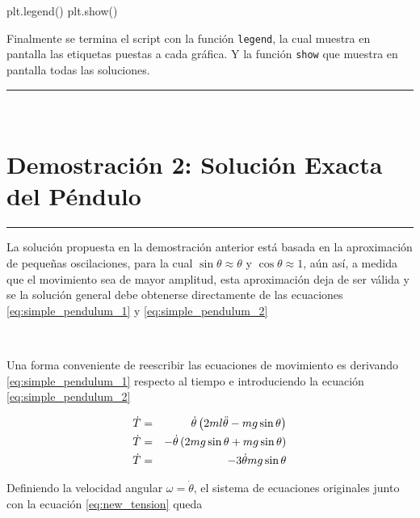 \begin{listing}[style=python, numbers = none]
plt.legend()
plt.show()
\end{listing}
Finalmente se termina el script con la función \texttt{legend}, la cual 
muestra en pantalla las etiquetas puestas a cada gráfica. Y la función 
\texttt{show} que muestra en pantalla todas las soluciones.

\rule{14cm}{0.5mm}



\
\section{Demostración 2: Solución Exacta del Péndulo}
\label{sec:DEMO2_02}
\rule{14cm}{0.5mm}

La solución propuesta en la demostración anterior está basada en la 
aproximación de pequeñas oscilaciones, para la cual $\sin \theta \approx 
\theta$ y $\cos \theta \approx 1$, aún así, a medida que el movimiento sea
de mayor amplitud, esta aproximación deja de ser válida y se la solución 
general debe obtenerse directamente de las ecuaciones 
\ref{eq:simple_pendulum_1} y \ref{eq:simple_pendulum_2}

\

Una forma conveniente de reescribir las ecuaciones de movimiento es derivando
\ref{eq:simple_pendulum_1} respecto al tiempo e introduciendo la ecuación
\ref{eq:simple_pendulum_2}


\begin{eqnarray}
\nonumber
\dot T &=& \dot \theta \left(  2ml\ddot \theta - mg\sin \theta  \right) \\
\nonumber
\dot T &=& -\dot \theta \left(  2mg\sin \theta + mg\sin \theta  \right) \\
\label{eq:new_tension}
\dot T &=& -3\dot \theta mg\sin \theta
\end{eqnarray}


Definiendo la velocidad angular $\omega = \dot \theta$, el sistema de 
ecuaciones originales junto con la ecuación \ref{eq:new_tension} queda



